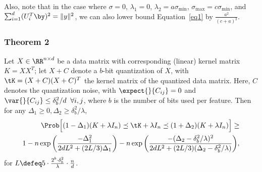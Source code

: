 Also, note that in the case where $\sigma = 0$, $\lambda_1 = 0$, $\lambda_2 = a \sigma_{\min}$, $\sigma_{\max} = c\sigma_{\min}$, and $\sum_{i=1}^d (U_i^T \by)^2 = \|y\|^2$, we can also lower bound Equation~\eqref{eq1} by $\frac{a^2}{(c+a)^2}$.

\subsubsection{Theorem 2}

\begin{theorem}
	\label{thm2}
	Let $X \in \RR^{n\times d}$ be a data matrix with corresponding (linear) kernel matrix $K = XX^T$; let $X+C$ denote a $b$-bit quantization of $X$, with $\tK = (X+C)(X+C)^T$ the kernel matrix of the quantized data matrix. Here, $C$ denotes the quantization noise, with $\expect{}{C_{ij}} = 0$ and $\var{}{C_{ij}} \leq \delta_b^2/d \;\;\forall i,j$, where $b$ is the number of bits used per feature.
	Then for any $\Delta_1 \geq 0, \Delta_2 \geq \delta^2_b/\lambda$,
	\begin{eqnarray}
	\Prob\Big[(1 - \Delta_1) (K + \lambda I_n) \preceq \tK + \lambda I_n \preceq (1 + \Delta_2) (K + \lambda I_n)
	\Big] 
	\geq \\ 1 - 
	n \exp \bigg(\frac{-\Delta_1^2}{2dL^2 + (2L/3)\Delta_1}\bigg) -
	n \exp \bigg(\frac{-(\Delta_2-\delta_b^2/\lambda)^2}{2dL^2 + (2L/3)(\Delta_2-\delta_b^2/\lambda)}\bigg),
	\end{eqnarray}
	for $L \defeq 5 \cdot \frac{2^b \cdot \delta_b^2}{\lambda}\cdot \frac{n}{d}$.
\end{theorem}



